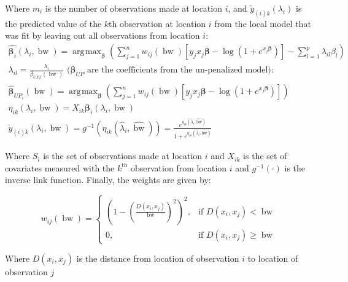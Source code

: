 \documentclass[10pt]{amsart}
\DeclareMathOperator*{\argmax}{\arg\!\max}
\DeclareMathOperator*{\bw}{\mbox{bw}}
\newcommand{\vect}[1]{\boldsymbol{#1}}
\begin{document}
		Where $m_i$ is the number of observations made at location $i$, and $\tilde{y}_{(i)k}(\lambda_i)$ is the predicted value of the $k$th observation at location $i$ from the local model that was fit by leaving out all observations from location $i$:		
		\begin{gather*}
			\hat{\vect{\beta}_i}(\lambda_i, \bw) = \argmax_{\vect{\beta}} \left( \sum_{j=1}^n w_{ij}(\bw) \left[y_j x_j \vect{\beta} - \log{(1+e^{x_j \vect{\beta}})} \right] -  \sum_{l=1}^p \lambda_{il} \beta_l \right)\\	
			\lambda_{il} = \frac{\lambda_i}{\beta_{UP_i l}(\bw)} \text{ (} \vect{\beta}_{UP} \text{ are the coefficients from the un-penalized model):}\\
			\hat{\vect{\beta}}_{UP_i}(\bw) = \argmax_{\vect{\beta}} \left( \sum_{j=1}^n w_{ij}(\bw) \left[ y_j x_j \vect{\beta} - \log{(1+e^{x_j \vect{\beta}})} \right] \right)\\	
			\eta_{ik}(\lambda_i, \bw) = X_{ik}\vect{\beta}_i(\lambda_i, \bw)\\
			\tilde{y}_{(i)k}(\lambda_i, \bw) = g^{-1}(\eta_{ik}(\hat{\lambda}_i, \hat{\bw})) = \frac{e^{\eta_{ik}(\hat{\lambda}_i, \hat{\text{bw}})}}{1+e^{\eta_{ik}(\hat{\lambda}_i, \hat{\text{bw}})}}			
		\end{gather*}
		
		Where $S_i$ is the set of observations made at location $i$ and $X_{ik}$ is the set of covariates measured with the $k^{\text{th}}$ observation from location $i$ and $g^{-1}(\cdot)$ is the inverse link function. Finally, the weights are given by:
		
		\[
			w_{ij}(\bw) =  \begin{cases} \left(1-\left(\frac{D(x_i,x_j)}{\bw}\right)^2\right)^2, & \mbox{if } D(x_i,x_j) < \bw \\
			0, & \mbox{if }D(x_i,x_j) \ge \bw \end{cases}
		\]		
		
		Where $D(x_i,x_j)$ is the distance from location of observation $i$ to location of observation $j$

		


\end{document}
